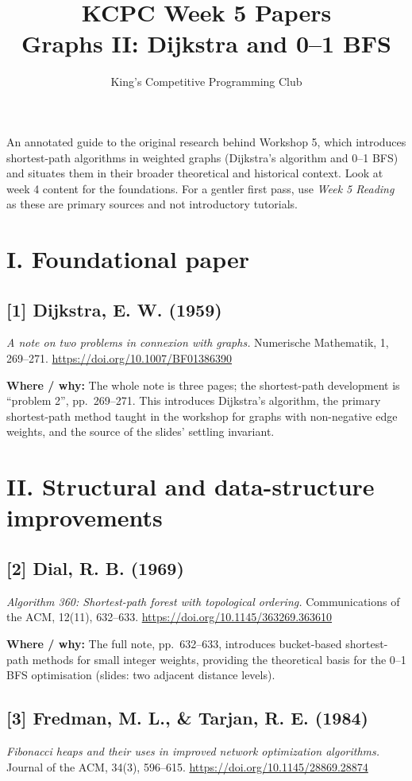 \documentclass[11pt]{article}
\title{KCPC Week 5 Papers\\Graphs II: Dijkstra and 0--1 BFS}
\author{King's Competitive Programming Club}
\date{}
\begin{document}
\maketitle\thispagestyle{fancy}

An annotated guide to the original research behind Workshop 5, which introduces shortest-path algorithms in weighted graphs (Dijkstra's algorithm and 0--1 BFS) and situates them in their broader theoretical and historical context. Look at week 4 content for the foundations. For a gentler first pass, use \emph{Week 5 Reading} as these are primary sources and not introductory tutorials.

\section*{I. Foundational paper}

\subsection*{[1] Dijkstra, E. W. (1959)}
\textit{A note on two problems in connexion with graphs.}
Numerische Mathematik, 1, 269--271.
\url{https://doi.org/10.1007/BF01386390}

\textbf{Where / why:} The whole note is three pages; the shortest-path development is ``problem 2'', pp.~269--271. This introduces Dijkstra's algorithm, the primary shortest-path method taught in the workshop for graphs with non-negative edge weights, and the source of the slides' settling invariant.

\section*{II. Structural and data-structure improvements}

\subsection*{[2] Dial, R. B. (1969)}
\textit{Algorithm 360: Shortest-path forest with topological ordering.}
Communications of the ACM, 12(11), 632--633.
\url{https://doi.org/10.1145/363269.363610}

\textbf{Where / why:} The full note, pp.~632--633, introduces bucket-based shortest-path methods for small integer weights, providing the theoretical basis for the 0--1 BFS optimisation (slides: two adjacent distance levels).

\subsection*{[3] Fredman, M. L., \& Tarjan, R. E. (1984)}
\textit{Fibonacci heaps and their uses in improved network optimization algorithms.}
Journal of the ACM, 34(3), 596--615.
\url{https://doi.org/10.1145/28869.28874}
\end{document}
